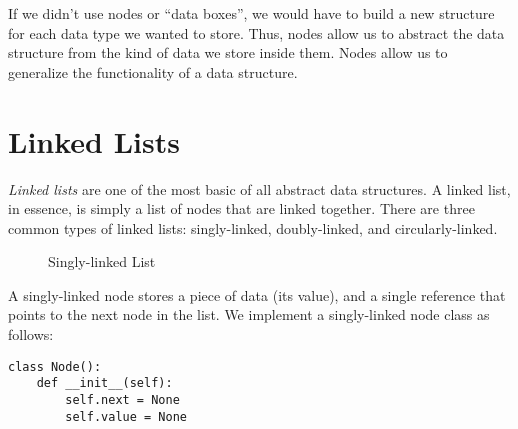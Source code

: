 If we didn't use nodes or ``data boxes'', we would have to build a new structure for each data type we wanted to store.
Thus, nodes allow us to abstract the data structure from the kind of data we store inside them.
Nodes allow us to generalize the functionality of a data structure.

\section*{Linked Lists}
\emph{Linked lists} are one of the most basic of all abstract data structures.
A linked list, in essence, is simply a list of nodes that are linked together.
There are three common types of linked lists: singly-linked, doubly-linked, and circularly-linked.

\begin{figure}[h]
\centering
{}
\caption{Singly-linked List}
\end{figure}

A singly-linked node stores a piece of data (its value), and a single reference that points to the next node in the list.
We implement a singly-linked node class as follows:

\begin{lstlisting}
class Node():
    def __init__(self):
        self.next = None
        self.value = None
\end{lstlisting}

